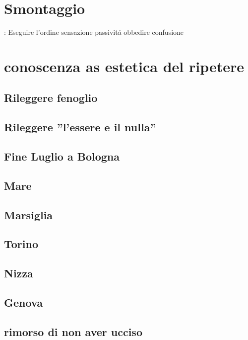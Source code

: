 \section{Smontaggio}

: Eseguire l'ordine sensazione passivit\'a obbedire confusione

\section{conoscenza as estetica del ripetere}

\subsection{Rileggere fenoglio}

\subsection{Rileggere ''l'essere e il nulla''}

\subsection{Fine Luglio a Bologna}

\subsection{Mare}

\subsection{Marsiglia}

\subsection{Torino}

\subsection{Nizza}

\subsection{Genova}

\subsection{rimorso di non aver ucciso}

